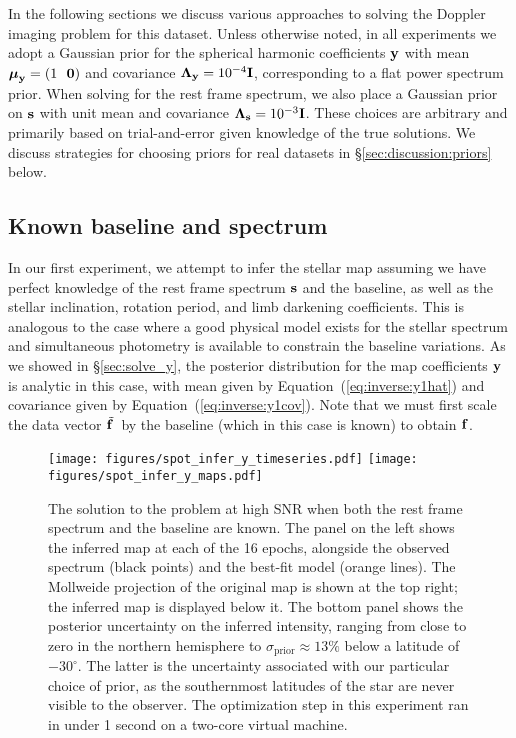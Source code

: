 \documentclass[modern]{aastex631}
\def\timeInferY{under 1 second\xspace}
\begin{document}
In the following sections we discuss various approaches to solving the Doppler imaging problem for this dataset.
Unless otherwise noted, in all experiments we adopt a Gaussian prior for the spherical harmonic coefficients ${\mathbf{y}}$ with mean $\boldsymbol{\mu}_\bvec{y} = \left(1 \quad\quad \bvec{0}\right)$ and covariance $\boldsymbol{\Lambda}_{\mathbf{y}} = 10^{-4} {\mathbf{I}}$, corresponding to a flat power spectrum prior.
When solving for the rest frame spectrum, we also place a Gaussian prior on ${\mathbf{s}}$ with unit mean and covariance $\boldsymbol{\Lambda}_{\mathbf{s}} = 10^{-3}{\mathbf{I}}$.
These choices are arbitrary and primarily based on trial-and-error given knowledge of the true solutions.
We discuss strategies for choosing priors for real datasets in \S\ref{sec:discussion:priors} below.

\subsection{Known baseline and spectrum}
\label{sec:spot_y1}
%
In our first experiment, we attempt to infer the stellar map assuming we have perfect knowledge of the rest frame spectrum ${\mathbf{s}}$ and the baseline, as well as the stellar inclination, rotation period, and limb darkening coefficients.
This is analogous to the case where a good physical model exists for the stellar spectrum and simultaneous photometry is available to constrain the baseline variations.
As we showed in \S\ref{sec:solve_y}, the posterior distribution for the map coefficients ${\mathbf{y}}$ is analytic in this case, with mean given by Equation~(\ref{eq:inverse:y1hat}) and covariance given by Equation~(\ref{eq:inverse:y1cov}). 
Note that we must first scale the data vector $\tilde{{\mathbf{f}}\hspace{0.2em}}$ by the baseline (which in this case is known) to obtain ${\mathbf{f}}$.

\begin{figure}[p!]
    \begin{centering}
        \texttt{[image: figures/spot\_infer\_y\_timeseries.pdf]}
        \texttt{[image: figures/spot\_infer\_y\_maps.pdf]}
        \caption{%
            The solution to the \spot problem at high SNR when both the rest frame spectrum and the baseline are known.
            The panel on the left shows the inferred map at each of the 16 epochs, alongside the observed spectrum (black points) and the best-fit model (orange lines). 
            The Mollweide projection of the original map is shown at the top right; the inferred map is displayed below it. 
            The bottom panel shows the posterior uncertainty on the inferred intensity, ranging from close to zero in the northern hemisphere to $\sigma_\mathrm{prior} \approx 13\%$ below a latitude of $-30^\circ$. 
            The latter is the uncertainty associated with our particular choice of prior, as the southernmost latitudes of the star are never visible to the observer.
            The optimization step in this experiment ran in \timeInferY on a two-core virtual machine.
        }
        \label{fig:spot_infer_y}
    \end{centering}
\end{figure}
\end{document}

